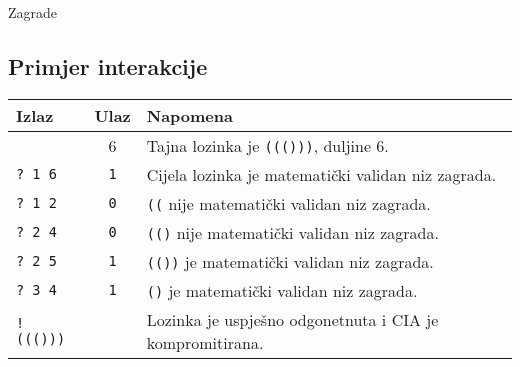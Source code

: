 \begin{statement}[
  problempoints=100,
  timelimit=1 sekunda,
  memorylimit=512 MiB,
]{Zagrade}
\subsection*{Primjer interakcije}
{\renewcommand{\arraystretch}{1.4}
  \setlength{\tabcolsep}{6pt}
  \begin{tabular}{lcl}
    Izlaz & Ulaz & Napomena \\ \midrule
      & 6 & Tajna lozinka je \texttt{((()))}, duljine 6. \\
    \texttt{\frenchspacing? 1 6} & \texttt{1} & Cijela lozinka je matematički validan niz zagrada. \\
    \texttt{\frenchspacing? 1 2} & \texttt{0} & \texttt{((} nije matematički validan niz zagrada. \\
    \texttt{\frenchspacing? 2 4} & \texttt{0} & \texttt{(()} nije matematički validan niz zagrada. \\
    \texttt{\frenchspacing? 2 5} & \texttt{1} & \texttt{(())} je matematički validan niz zagrada. \\
    \texttt{\frenchspacing? 3 4} & \texttt{1} & \texttt{()} je matematički validan niz zagrada. \\
    \texttt{\frenchspacing! ((()))} & & Lozinka je uspješno odgonetnuta i CIA je kompromitirana. \\
\end{tabular}}

\end{statement}

